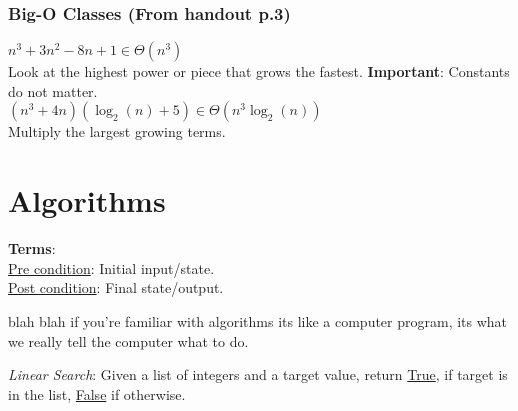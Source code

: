 \documentclass{article}
\begin{document}
        \subsubsection{Big-O Classes (From handout p.3)}

            $n^3 + 3n^2 - 8n + 1 \in \Theta(n^3)$ \\

            Look at the highest power or piece that grows the fastest. \textbf{Important}: Constants do not matter. \\

            \noindent $(n^3 + 4n)(\log_2(n) + 5) \in \Theta(n^3\log_2(n))$ \\

            Multiply the largest growing terms.

        
            
\newpage
    


\section{Algorithms}
    \begin{definition}
        \textbf{Terms}: \\
        \underline{Pre condition}: Initial input/state. \\
        \underline{Post condition}: Final state/output.
    \end{definition}

    \begin{yap}
        blah blah if you're familiar with algorithms its like a computer program, its what we really tell the computer what to do.
    \end{yap}

    \begin{definition}
        \textit{Linear Search}: Given a list of integers and a target value, return \underline{True}, if target is in the list, \underline{False} if otherwise.
    \end{definition}
\end{document}
